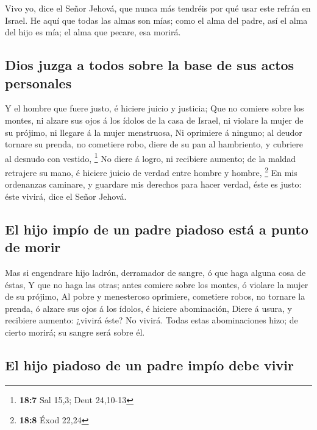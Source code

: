  Vivo yo, dice el Señor Jehová, que nunca más tendréis por
qué usar este refrán en Israel.  He aquí que todas las
almas son mías; como el alma del padre, así el alma del hijo es mía; el
alma que pecare, esa morirá.

\hypertarget{dios-juzga-a-todos-sobre-la-base-de-sus-actos-personales}{%
\subsection{Dios juzga a todos sobre la base de sus actos
personales}\label{dios-juzga-a-todos-sobre-la-base-de-sus-actos-personales}}

 Y el hombre que fuere justo, é hiciere juicio y justicia;
 Que no comiere sobre los montes, ni alzare sus ojos á los
ídolos de la casa de Israel, ni violare la mujer de su prójimo, ni
llegare á la mujer menstruosa,  Ni oprimiere á ninguno; al
deudor tornare su prenda, no cometiere robo, diere de su pan al
hambriento, y cubriere al desnudo con vestido, \footnote{\textbf{18:7}
  Sal 15,3; Deut 24,10-13}  No diere á logro, ni recibiere
aumento; de la maldad retrajere su mano, é hiciere juicio de verdad
entre hombre y hombre, \footnote{\textbf{18:8} Éxod 22,24}
 En mis ordenanzas caminare, y guardare mis derechos para
hacer verdad, éste es justo: éste vivirá, dice el Señor Jehová.

\hypertarget{el-hijo-impuxedo-de-un-padre-piadoso-estuxe1-a-punto-de-morir}{%
\subsection{El hijo impío de un padre piadoso está a punto de
morir}\label{el-hijo-impuxedo-de-un-padre-piadoso-estuxe1-a-punto-de-morir}}

 Mas si engendrare hijo ladrón, derramador de sangre, ó
que haga alguna cosa de éstas,  Y que no haga las otras;
antes comiere sobre los montes, ó violare la mujer de su prójimo,
 Al pobre y menesteroso oprimiere, cometiere robos, no
tornare la prenda, ó alzare sus ojos á los ídolos, é hiciere
abominación,  Diere á usura, y recibiere aumento: ¿vivirá
éste? No vivirá. Todas estas abominaciones hizo; de cierto morirá; su
sangre será sobre él.

\hypertarget{el-hijo-piadoso-de-un-padre-impuxedo-debe-vivir}{%
\subsection{El hijo piadoso de un padre impío debe
vivir}\label{el-hijo-piadoso-de-un-padre-impuxedo-debe-vivir}}

